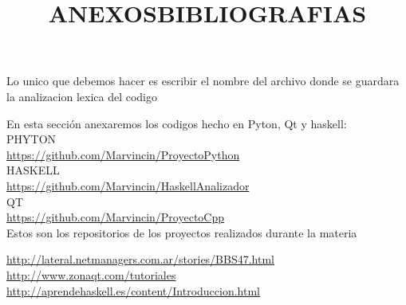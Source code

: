 \documentclass[12pt]{extbook}
\begin{document}
Lo unico que debemos hacer es escribir el nombre del archivo donde se guardara la analizacion lexica del codigo


\newpage
\begin{center}
\title{ANEXOS}\maketitle
\end{center}
En esta sección anexaremos los codigos hecho en Pyton, Qt y haskell:\\
PHYTON\\
\href{https://github.com/Marvincin/ProyectoPython}{https://github.com/Marvincin/ProyectoPython}\\
HASKELL\\
\href{https://github.com/Marvincin/Haskell_Analizador}{https://github.com/Marvincin/HaskellAnalizador}\\
QT\\
\href{https://github.com/Marvincin/ProyectoCpp}{https://github.com/Marvincin/ProyectoCpp}\\

Estos son los repositorios de los proyectos realizados durante la materia

\begin{center}
\title{BIBLIOGRAFIAS}\maketitle
\end{center}

\href{http://lateral.netmanagers.com.ar/stories/BBS47.html}{http://lateral.netmanagers.com.ar/stories/BBS47.html}\\
\href{http://www.zonaqt.com/tutoriales}{http://www.zonaqt.com/tutoriales}\\
\href{http://aprendehaskell.es/content/Introduccion.html}{http://aprendehaskell.es/content/Introduccion.html}
\end{document}
